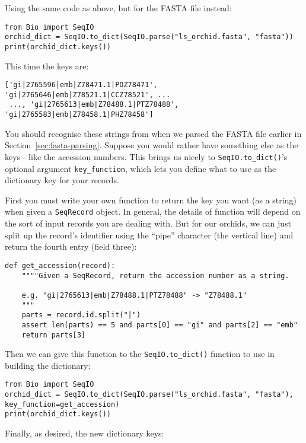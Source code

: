 Using the same code as above, but for the FASTA file instead:

\begin{verbatim}
from Bio import SeqIO
orchid_dict = SeqIO.to_dict(SeqIO.parse("ls_orchid.fasta", "fasta"))
print(orchid_dict.keys())
\end{verbatim}

\noindent This time the keys are:

\begin{verbatim}
['gi|2765596|emb|Z78471.1|PDZ78471', 'gi|2765646|emb|Z78521.1|CCZ78521', ...
 ..., 'gi|2765613|emb|Z78488.1|PTZ78488', 'gi|2765583|emb|Z78458.1|PHZ78458']
\end{verbatim}

You should recognise these strings from when we parsed the FASTA file earlier in Section~\ref{sec:fasta-parsing}.  Suppose you would rather have something else as the keys - like the accession numbers.  This brings us nicely to \verb|SeqIO.to_dict()|'s optional argument \verb|key_function|, which lets you define what to use as the dictionary key for your records.

First you must write your own function to return the key you want (as a string) when given a \verb|SeqRecord| object.  In general, the details of function will depend on the sort of input records you are dealing with.  But for our orchids, we can just split up the record's identifier using the ``pipe'' character (the vertical line) and return the fourth entry (field three):

\begin{verbatim}
def get_accession(record):
    """"Given a SeqRecord, return the accession number as a string.

    e.g. "gi|2765613|emb|Z78488.1|PTZ78488" -> "Z78488.1"
    """
    parts = record.id.split("|")
    assert len(parts) == 5 and parts[0] == "gi" and parts[2] == "emb"
    return parts[3]
\end{verbatim}

\noindent Then we can give this function to the \verb|SeqIO.to_dict()| function to use in building the dictionary:

\begin{verbatim}
from Bio import SeqIO
orchid_dict = SeqIO.to_dict(SeqIO.parse("ls_orchid.fasta", "fasta"), key_function=get_accession)
print(orchid_dict.keys())
\end{verbatim}

\noindent Finally, as desired, the new dictionary keys:

